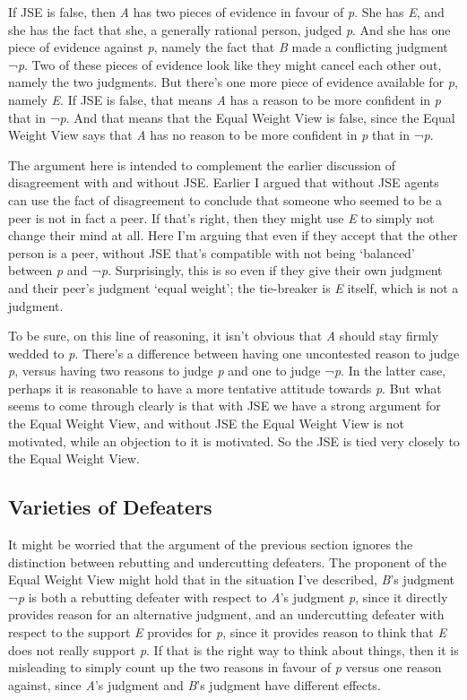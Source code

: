 \documentclass[
  10pt,
  letterpaper,
  DIV=11,
  numbers=noendperiod,
  twoside]{scrartcl}
\begin{document}
If JSE is false, then \emph{A} has two pieces of evidence in favour of
\emph{p}. She has \emph{E}, and she has the fact that she, a generally
rational person, judged \emph{p}. And she has one piece of evidence
against \emph{p}, namely the fact that \emph{B} made a conflicting
judgment ¬\emph{p}. Two of these pieces of evidence look like they might
cancel each other out, namely the two judgments. But there's one more
piece of evidence available for \emph{p}, namely \emph{E}. If JSE is
false, that means \emph{A} has a reason to be more confident in \emph{p}
that in ¬\emph{p}. And that means that the Equal Weight View is false,
since the Equal Weight View says that \emph{A} has no reason to be more
confident in \emph{p} that in ¬\emph{p}.

The argument here is intended to complement the earlier discussion of
disagreement with and without JSE. Earlier I argued that without JSE
agents can use the fact of disagreement to conclude that someone who
seemed to be a peer is not in fact a peer. If that's right, then they
might use \emph{E} to simply not change their mind at all. Here I'm
arguing that even if they accept that the other person is a peer,
without JSE that's compatible with not being `balanced' between \emph{p}
and ¬\emph{p}. Surprisingly, this is so even if they give their own
judgment and their peer's judgment `equal weight'; the tie-breaker is
\emph{E} itself, which is not a judgment.

To be sure, on this line of reasoning, it isn't obvious that \emph{A}
should stay firmly wedded to \emph{p}. There's a difference between
having one uncontested reason to judge \emph{p}, versus having two
reasons to judge \emph{p} and one to judge ¬\emph{p}. In the latter
case, perhaps it is reasonable to have a more tentative attitude towards
\emph{p}. But what seems to come through clearly is that with JSE we
have a strong argument for the Equal Weight View, and without JSE the
Equal Weight View is not motivated, while an objection to it is
motivated. So the JSE is tied very closely to the Equal Weight View.

\subsection{Varieties of Defeaters}\label{varieties-of-defeaters}

It might be worried that the argument of the previous section ignores
the distinction between rebutting and undercutting defeaters. The
proponent of the Equal Weight View might hold that in the situation I've
described, \emph{B}'s judgment ¬\emph{p} is both a rebutting defeater
with respect to \emph{A}'s judgment \emph{p}, since it directly provides
reason for an alternative judgment, and an undercutting defeater with
respect to the support \emph{E} provides for \emph{p}, since it provides
reason to think that \emph{E} does not really support \emph{p}. If that
is the right way to think about things, then it is misleading to simply
count up the two reasons in favour of \emph{p} versus one reason
against, since \emph{A}'s judgment and \emph{B}'s judgment have
different effects.
\end{document}
